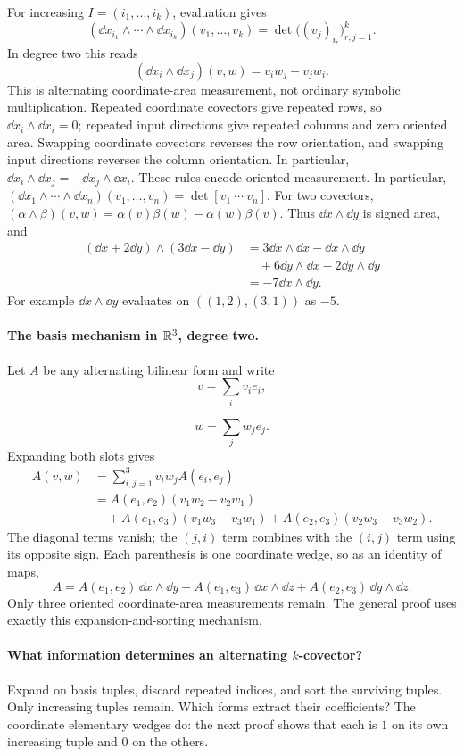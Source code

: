 For increasing $I=(i_1,\ldots,i_k)$, evaluation gives
\[
(\dd x_{i_1}\wedge\cdots\wedge\dd x_{i_k})(v_1,\ldots,v_k)
=\det\bigl((v_j)_{i_r}\bigr)_{r,j=1}^k.
\]
In degree two this reads
\[
(\dd x_i\wedge\dd x_j)(v,w)=v_iw_j-v_jw_i.
\]
This is alternating coordinate-area measurement, not ordinary symbolic
multiplication. Repeated coordinate covectors give repeated rows, so
$\dd x_i\wedge\dd x_i=0$; repeated input directions give repeated
columns and zero oriented area. Swapping coordinate covectors reverses
the row orientation, and swapping input directions reverses the column
orientation. In particular,
$\dd x_i\wedge\dd x_j=-\dd x_j\wedge\dd x_i$.
These rules encode oriented measurement.
In particular,
$(\dd x_1\wedge\cdots\wedge\dd x_n)(v_1,\ldots,v_n)
=\det[v_1\ \cdots\ v_n]$.
For two covectors,
$(\alpha\wedge\beta)(v,w)=\alpha(v)\beta(w)-\alpha(w)\beta(v)$.
Thus $\dd x\wedge\dd y$ is signed area, and
\[
\begin{aligned}
(\dd x+2\dd y)\wedge(3\dd x-\dd y)
&=3\dd x\wedge\dd x-\dd x\wedge\dd y\\
&\quad+6\dd y\wedge\dd x-2\dd y\wedge\dd y\\
&=-7\dd x\wedge\dd y.
\end{aligned}
\]
For example $\dd x\wedge\dd y$ evaluates on $((1,2),(3,1))$ as $-5$.

\paragraph{The basis mechanism in $\mathbb{R}^3$, degree two.}
Let $A$ be any alternating bilinear form and write
\[
v=\sum_i v_i e_i,
\]


\[
w=\sum_j w_j e_j.
\]
 Expanding both slots gives
\[
\begin{aligned}
A(v,w)&=\sum_{i,j=1}^3 v_iw_j A(e_i,e_j)\\
&=A(e_1,e_2)(v_1w_2-v_2w_1)\\
&\quad+A(e_1,e_3)(v_1w_3-v_3w_1)
+A(e_2,e_3)(v_2w_3-v_3w_2).
\end{aligned}
\]
The diagonal terms vanish; the $(j,i)$ term combines with the $(i,j)$
term using its opposite sign. Each parenthesis is one coordinate wedge,
so as an identity of maps,
\[
A=A(e_1,e_2)\,\dd x\wedge\dd y
+A(e_1,e_3)\,\dd x\wedge\dd z
+A(e_2,e_3)\,\dd y\wedge\dd z.
\]
Only three oriented coordinate-area measurements remain. The general proof
uses exactly this expansion-and-sorting mechanism.

\paragraph{What information determines an alternating $k$-covector?}
Expand on basis tuples, discard repeated indices, and sort the surviving
tuples. Only increasing tuples remain. Which forms extract their
coefficients? The coordinate elementary wedges do: the next proof shows
that each is $1$ on its own increasing tuple and $0$ on the others.

